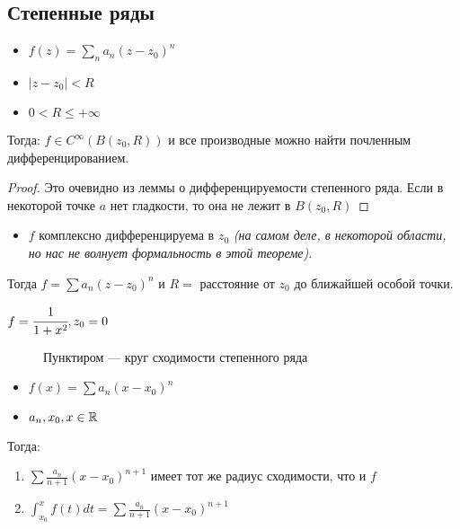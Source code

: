

\cfoot{}



\subsection*{Степенные ряды}

\begin{corollary}\itemfix
    \begin{itemize}
        \item \(f(z) = \sum_n a_n(z - z_0)^n\)
        \item \(|z - z_0| < R\)
        \item \(0 < R\le +\infty\)
    \end{itemize}
    Тогда: \(f\in C^{\infty}(B(z_0, R))\) и все производные можно найти почленным дифференцированием.
\end{corollary}
\begin{proof}
    Это очевидно из леммы о дифференцируемости степенного ряда. Если в некоторой точке \(a\) нет гладкости, то она не лежит в \(B(z_0, R)\)
\end{proof}

\begin{theorem}[из ТФКП]\itemfix
    \begin{itemize}
        \item \(f\) комплексно дифференцируема в \(z_0\) \textit{(на самом деле, в некоторой области, но нас не волнует формальность в этой теореме)}.
    \end{itemize}
    Тогда \(f =\sum a_n(z - z_0)^n\) и \(R =\) расстояние от \(z_0\) до ближайшей особой точки.
\end{theorem}

\begin{example}
    \(f = \cfrac{1}{1 + x^2}, z_0 = 0\)

    \begin{figure}[h]
        \centering
        
        \caption{Пунктиром --- круг сходимости степенного ряда}
    \end{figure}
\end{example}

\begin{corollary}\itemfix
    \begin{itemize}
        \item \(f(x) = \sum a_n(x - x_0)^n\)
        \item \(a_n, x_0, x\in\mathbb{R}\)
    \end{itemize}
    Тогда:
    \begin{enumerate}
        \item \(\sum \frac{a_n}{n + 1}(x - x_0)^{n + 1}\) имеет тот же радиус сходимости, что и \(f\)
        \item \(\int_{x_0}^x f(t)dt = \sum \frac{a_n}{n + 1}(x - x_0)^{n + 1}\)
    \end{enumerate}
\end{corollary}

